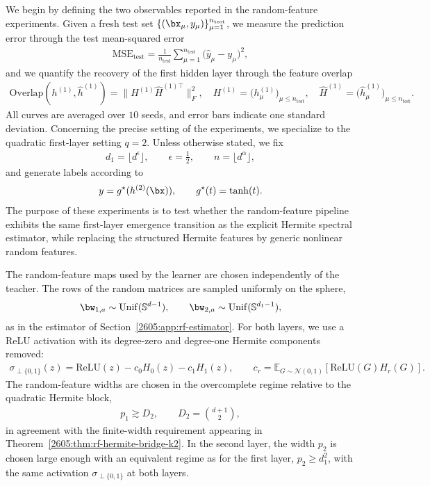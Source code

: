 We begin by defining the two observables reported in the random-feature experiments. 
Given a fresh test set \(\{(\bx_\mu,y_\mu)\}_{\mu=1}^{n_{\mathrm{test}}}\), we measure the prediction error through the test mean-squared error
\begin{align}
    \mathrm{MSE}_{\mathrm{test}}
    =
    \frac{1}{n_{\mathrm{test}}}
    \sum_{\mu=1}^{n_{\mathrm{test}}}
    \bigl(\hat y_\mu-y_\mu\bigr)^2,
\end{align}
and we quantify the recovery of the first hidden layer through the feature overlap
\begin{align}
    \mathrm{Overlap}(h^{(1)},\widehat h^{(1)})
    =
    \bigl\|
    H^{(1)} \hat H^{(1)\top}
    \bigr\|_F^2,
    \quad
    H^{(1)} = \bigl(h^{(1)}_\mu\bigr)_{\mu \le n_{\mathrm{test}}},
    \quad
    \hat H^{(1)} = \bigl(\hat h^{(1)}_\mu\bigr)_{\mu \le n_{\mathrm{test}}}.
\end{align}
All curves are averaged over \(10\) seeds, and error bars indicate one standard deviation.
Concerning the precise setting of the experiments, we specialize to the quadratic first-layer setting \(q=2\). Unless otherwise stated, we fix
\begin{align}
    d_1=\lfloor d^\epsilon\rfloor,
    \qquad
    \epsilon=\frac12,
    \qquad
    n=\lfloor d^\alpha\rfloor,
\end{align}
and generate labels according to
\begin{align}
    y = g^\star(h^{(2)}(\bx)),
    \qquad
    g^\star(t)=\tanh(t).
\end{align}
The purpose of these experiments is to test whether the random-feature pipeline exhibits the same first-layer emergence transition as the explicit Hermite spectral estimator, while replacing the structured Hermite features by generic nonlinear random features.

The random-feature maps used by the learner are chosen independently of the teacher. The rows of the random matrices are sampled uniformly on the sphere,
\begin{align}
    \bw_{1,a}\sim \mathrm{Unif}(\mathbb S^{d-1}),
    \qquad
    \bw_{2,a}\sim \mathrm{Unif}(\mathbb S^{d_1-1}),
\end{align}
as in the estimator of Section~\ref{2605:app:rf-estimator}. For both layers, we use a ReLU activation with its degree-zero and degree-one Hermite components removed:
\begin{align}
    \sigma_{\perp\{0,1\}}(z)
    =
    \mathrm{ReLU}(z)
    -
    c_0 H_0(z)
    -
    c_1 H_1(z),
    \qquad
    c_r
    =
    \mathbb E_{G\sim\mathcal N(0,1)}
    \left[
        \mathrm{ReLU}(G)H_r(G)
    \right].
\end{align}
The random-feature widths are chosen in the overcomplete regime relative to the quadratic Hermite block,
\begin{align}
    p_1 \gtrsim D_2,
    \qquad
    D_2=\binom{d+1}{2},
\end{align}
in agreement with the finite-width requirement appearing in Theorem~\ref{2605:thm:rf-hermite-bridge-k2}. In the second layer, the width $p_2$ is chosen large enough with an equivalent regime as for the first layer, $p_2\geq d_1^2$, with the same activation $\sigma_{\perp\{0,1\}}$ at both layers.

